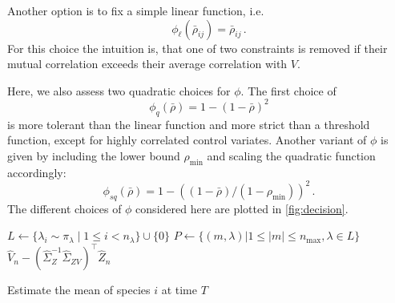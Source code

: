 Another option is to fix a simple linear function, i.e.\ \[ \phi_{\ell}(\bar\rho_{ij})=\bar\rho_{ij}\,.\]
For this choice the intuition is, that one of two constraints is removed if their mutual
correlation exceeds their average correlation with $V$.


Here, we also assess two quadratic choices for $\phi$. The first choice of
\[
	\phi_{q}(\bar\rho)=1 - (1-\bar\rho)^2
\]
is more tolerant than the linear function and more strict than a threshold function, except for
highly correlated control  variates.
Another variant of $\phi$ is given by including the lower bound $\rho_{\min}$ and scaling
the quadratic function accordingly:
\[ \phi_{\mathit{sq}}(\bar\rho)=1-((1-\bar\rho)/(1-\rho_{\min}))^2\,.\]
The different choices of $\phi$ considered here are plotted in \autoref{fig:decision}.
\begin{algorithm}[ht]
  $L\leftarrow\{\lambda_i\sim \pi_\lambda \mid 1\leq i< n_{\lambda} \} \cup \{ 0 \}$\label{line:lambda_sample}\;
  $P \leftarrow \{ ({m}, \lambda) | 1\leq\lvert {m} \rvert \leq n_{\max}, \lambda\in L\}$\label{line:init_covs}\;
\Return $\hat{V}_n - {(\hat{\Sigma}_{{Z}}^{-1}\hat\Sigma_{{Z}V})}^{\top}\hat{{Z}}_n$\label{line:compute_lcv}\;
    \caption{\label{alg:ssa:lcv}Estimate the mean of species $i$ at time $T$}
\end{algorithm}
